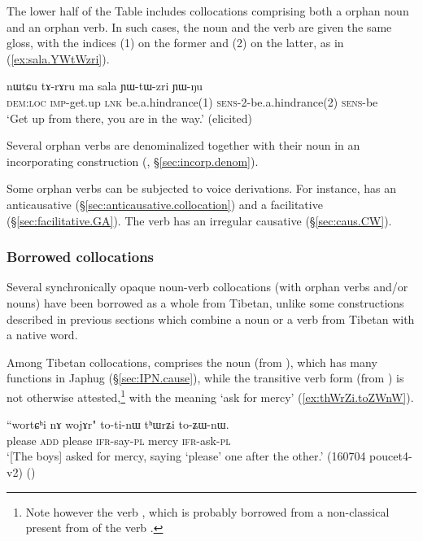 The lower half of the Table includes collocations comprising both a orphan noun and an orphan verb. In such cases, the noun and the verb are given the same gloss, with the indices (1) on the former and (2) on the latter, as in (\ref{ex:sala.YWtWzri}). %

\begin{exe}
\ex \label{ex:sala.YWtWzri}
\gll nɯtɕu tɤ-rɤru ma sala ɲɯ-tɯ-zri ɲɯ-ŋu \\
\textsc{dem}:\textsc{loc} \textsc{imp}-get.up \textsc{lnk} be.a.hindrance(1) \textsc{sens}-2-be.a.hindrance(2) \textsc{sens}-be \\
\glt `Get up from there, you are in the way.' (elicited)
\end{exe}

Several orphan verbs are denominalized together with their noun in an incorporating construction (, §\ref{sec:incorp.denom}).

Some orphan verbs can be subjected to voice derivations. For instance,  has an anticausative  (§\ref{sec:anticausative.collocation}) and a facilitative (§\ref{sec:facilitative.GA}). The verb  has an irregular  causative (§\ref{sec:caus.CW}).


\subsubsection{Borrowed collocations} \label{sec:borrowed.NV}
Several synchronically opaque noun-verb collocations (with orphan verbs and/or nouns) have been borrowed as a whole from Tibetan, unlike some constructions described in previous sections which combine a noun or a verb from Tibetan with a native word.

Among Tibetan collocations,  comprises the noun   (from ), which has many functions in Japhug (§\ref{sec:IPN.cause}), while the  transitive verb form  (from ) is not otherwise attested,\footnote{Note however the verb , which is probably borrowed from a non-classical present from  of the verb . } with the meaning `ask for mercy' (\ref{ex:thWrZi.toZWnW}).

\begin{exe}
\ex \label{ex:thWrZi.toZWnW}
\gll ``wortɕʰi nɤ wojɤr" to-ti-nɯ tʰɯrʑi to-ʑɯ-nɯ. \\
please \textsc{add} please \textsc{ifr}-say-\textsc{pl} mercy \textsc{ifr}-ask-\textsc{pl} \\
\glt `[The boys] asked for mercy, saying `please' one after the other.' (160704 poucet4-v2)
()
 \end{exe}  
 
